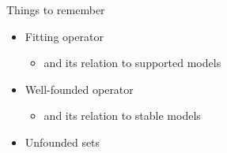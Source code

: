 \begin{frame}{Things to remember}
  \medskip
  \begin{itemize}
  \item Fitting operator
    \begin{itemize}
    \item and its relation to supported models
    \end{itemize}
  \item Well-founded operator
    \begin{itemize}
    \item and its relation to stable models
    \end{itemize}
  \item Unfounded sets
  \end{itemize}
\end{frame}
%

